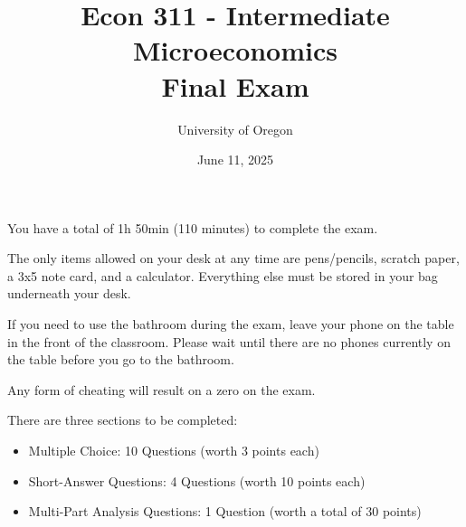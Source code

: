\documentclass{article}
\title{Econ 311 - Intermediate Microeconomics \\
       Final Exam}
\author{University of Oregon}
\date{June 11, 2025}
\begin{document}
\maketitle


\begin{center}
  
\end{center}

\begin{center}
\end{center}

\vspace{0.5in}

 

\vspace{0.5in}

You have a total of 1h 50min (110 minutes) to complete the exam.

The only items allowed on your desk at any time are pens/pencils, scratch paper, a 3x5 note card, and a calculator. Everything else must be stored in your bag underneath your desk.

If you need to use the bathroom during the exam, leave your phone on the table in the front of the classroom. Please wait until there are no phones currently on the table before you go to the bathroom.

Any form of cheating will result on a zero on the exam.

\vspace{0.25in}

There are three sections to be completed:
\begin{itemize}
  \item Multiple Choice: 10 Questions (worth 3 points each)
  \item Short-Answer Questions: 4 Questions (worth 10 points each)
  \item Multi-Part Analysis Questions: 1 Question (worth a total of 30 points)
\end{itemize}

\vspace{0.25in}
\end{document}
